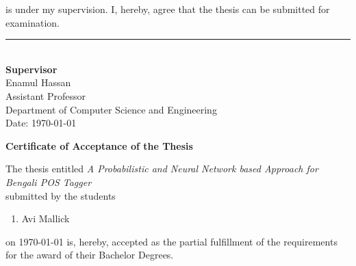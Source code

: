 \documentclass{standalone}
\begin{document}
\begin{titlepage}
\begin{enumerate}
				\end{enumerate}
				is under my supervision. I,
hereby, agree that the thesis can be submitted for examination.\\
                
				\vspace{3.0cm}
				\noindent
				\rule{250}{1}\\
				\textbf{Supervisor} \\
				Enamul Hassan\\
				Assistant Professor
				\\ Department of Computer Science and Engineering\\%
				Date: \today
			
				
				\newpage
				
			
				\begin{center}
					\textbf{\huge Certificate of Acceptance of the Thesis}
				\end{center}
				
				\noindent
				The thesis entitled \emph{A Probabilistic and Neural Network based Approach for Bengali POS Tagger}
				\\
				submitted by the students
					\begin{enumerate}
					\item Avi Mallick
				
				\end{enumerate}
				on \today
				\noindent
				\: is, hereby, accepted as the partial fulfillment of the requirements for the award of their Bachelor Degrees.
				 \vspace{2.0cm}
				

\end{titlepage}
\end{document}

